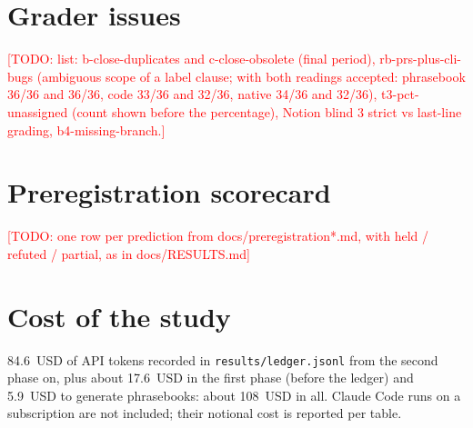 \documentclass[11pt]{article}
\newcommand{\todo}[1]{\textcolor{red}{[TODO: #1]}}
\begin{document}
\section{Grader issues}
\label{app:graders}
\todo{list: b-close-duplicates and c-close-obsolete (final period), rb-prs-plus-cli-bugs (ambiguous scope of a label clause; with both readings accepted: phrasebook 36/36 and 36/36, code 33/36 and 32/36, native 34/36 and 32/36), t3-pct-unassigned (count shown before the percentage), Notion blind 3 strict vs last-line grading, b4-missing-branch.}

\section{Preregistration scorecard}
\label{app:prereg}
\todo{one row per prediction from docs/preregistration*.md, with held / refuted / partial, as in docs/RESULTS.md}

\section{Cost of the study}
84.6~USD of API tokens recorded in \texttt{results/ledger.jsonl} from the second phase on, plus about 17.6~USD in the first phase (before the ledger) and 5.9~USD to generate phrasebooks: about 108~USD in all. Claude Code runs on a subscription are not included; their notional cost is reported per table.
\end{document}
